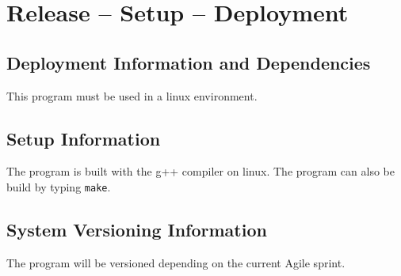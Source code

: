 
\chapter{Release -- Setup -- Deployment}


\section{Deployment Information and Dependencies}
This program must be used in a linux environment.



\section{Setup Information}
The program is built with the g++ compiler on linux. The program can also be build by typing {\tt make}.



\section{System  Versioning Information}
The program will be versioned depending on the current Agile sprint.